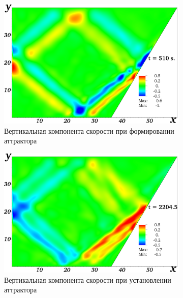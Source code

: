 \documentclass[utf8x]{G7-32} %
\begin{document}
\begin{figure}[h!]
  \centering
  \begin{subfigure}[с]{0.45\textwidth}
    \includegraphics[width=1\textwidth]{../pics/H40L60N1ap05dp20w1p63Deltawp05Biharm/2D36x36DiagramH40L60N1ap05dp20w0p63Deltawp3315BiharmVyn01019.png}
    \caption{Вертикальная компонента скорости при формировании аттрактора}
  \end{subfigure}
  \begin{subfigure}[с]{0.45\textwidth}
    \includegraphics[width=1\textwidth]{../pics/H40L60N1ap05dp20w1p63Deltawp05Biharm/2D36x36DiagramH40L60N1ap05dp20w0p63Deltawp3315BiharmVyn04408.png}
    \caption{Вертикальная компонента скорости при установлении аттрактора}
  \end{subfigure}
  \par
  \begin{subfigure}[с]{0.45\textwidth}

\end{subfigure}
\end{figure}
\end{document}
